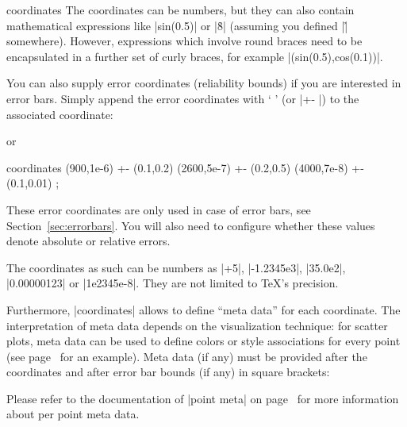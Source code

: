 {\begin{addplotoperation}[]{coordinates}{}
The coordinates can be numbers, but they can also contain mathematical
expressions like |sin(0.5)| or |\h*8| (assuming you defined |\h| somewhere).
However, expressions which involve round braces need to be encapsulated in a
further set of curly braces, for example |({sin(0.5)},{cos(0.1)})|.

You can also supply error coordinates (reliability bounds) if you are
interested in error bars. Simply append the error coordinates with
`\declareandlabel{+-} ' (or |+- |) to the associated
coordinate:
%
\begin{codeexample}[]
\end{codeexample}
%
or
%
\begin{codeexample}
\addplot coordinates {
     (900,1e-6) +- (0.1,0.2)
    (2600,5e-7) +- (0.2,0.5)
    (4000,7e-8) +- (0.1,0.01)
};
\end{codeexample}
%
These error coordinates are only used in case of error bars, see
Section~\ref{sec:errorbars}. You will also need to configure whether these
values denote absolute or relative errors.

The coordinates as such can be numbers as |+5|, |-1.2345e3|, |35.0e2|,
|0.00000123| or |1e2345e-8|. They are not limited to \TeX's precision.

Furthermore, |coordinates| allows to define ``meta data'' for each coordinate.
The interpretation of meta data depends on the visualization technique: for
scatter plots, meta data can be used to define colors or style associations for
every point (see page~\pageref{pgfplots:scatterclasses} for an example). Meta
data (if any) must be provided after the coordinates and after error bar bounds
(if any) in square brackets:
%
\begin{codeexample}[]
\end{codeexample}
%
Please refer to the documentation of |point meta| on
page~\pageref{pgfplots:point:meta} for more information about per point meta
data.


\end{addplotoperation}}
